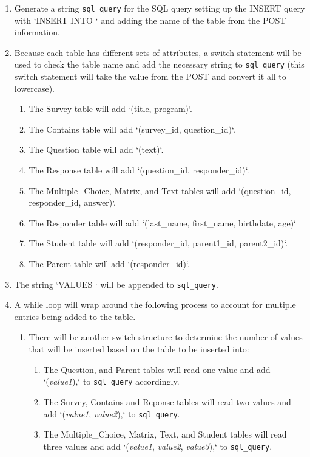 \begin{enumerate}
	\item Generate a string \texttt{sql\_query} for the SQL query setting up the INSERT query with `INSERT INTO ` and adding the name of the table from the POST information.
	\item Because each table has different sets of attributes, a switch statement will be used to check the table name and add the necessary string to \texttt{sql\_query} (this switch statement will take the value from the POST and convert it all to lowercase).
	\begin{enumerate}
		\item The Survey table will add `(title, program)`.
		\item The Contains table will add `(survey\_id, question\_id)`.
		\item The Question table will add `(text)`.
		\item The Response table will add `(question\_id, responder\_id)`.
		\item The Multiple\_Choice, Matrix, and Text tables will add `(question\_id, responder\_id, answer)`.
		\item The Responder table will add `(last\_name, first\_name, birthdate, age)`
		\item The Student table will add `(responder\_id, parent1\_id, parent2\_id)`.
		\item The Parent table will add `(responder\_id)`.
	\end{enumerate}
	\item The string `VALUES ` will be appended to \texttt{sql\_query}.
	\item A while loop will wrap around the following process to account for multiple entries being added to the table.
	\begin{enumerate}
		\item There will be another switch structure to determine the number of values that will be inserted based on the table to be inserted into:
		\begin{enumerate}
			\item The Question, and Parent tables will read one value and add `(\emph{value1}),` to \texttt{sql\_query} accordingly.
			\item The Survey, Contains and Reponse tables will read two values and add `(\emph{value1}, \emph{value2}),` to \texttt{sql\_query}.
			\item The Multiple\_Choice, Matrix, Text, and Student tables will read three values and add `(\emph{value1}, \emph{value2}, \emph{value3}),` to \texttt{sql\_query}.

\end{enumerate}
\end{enumerate}
\end{enumerate}
